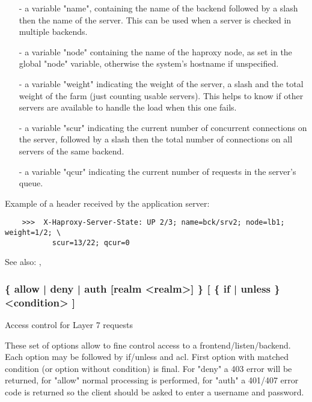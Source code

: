   \begin{itemize}
  \item[-]
      a variable "name", containing the name of the backend followed by a slash
      \chr{/} then the name of the server. This can be used when a server is
      checked in multiple backends.

  \item[-]
      a variable "node" containing the name of the haproxy node, as set in the
      global "node" variable, otherwise the system's hostname if unspecified.

  \item[-]
      a variable "weight" indicating the weight of the server, a slash \chr{/}
      and the total weight of the farm (just counting usable servers). This
      helps to know if other servers are available to handle the load when this
      one fails.

  \item[-]
      a variable "scur" indicating the current number of concurrent connections
      on the server, followed by a slash \chr{/} then the total number of
      connections on all servers of the same backend.

  \item[-]
      a variable "qcur" indicating the current number of requests in the
      server's queue.
  \end{itemize}

  Example of a header received by the application server:
  \begin{verbatim}
    >>>  X-Haproxy-Server-State: UP 2/3; name=bck/srv2; node=lb1; weight=1/2; \
           scur=13/22; qcur=0
  \end{verbatim}


See also: , 

\subsubsection[http-request]{ \{ allow | deny | auth [realm <realm>] \} [ \{ if | unless \} <condition> ]}
\index{http-request}

  Access control for Layer 7 requests


  These set of options allow to fine control access to a
  frontend/listen/backend. Each option may be followed by if/unless and acl.
  First option with matched condition (or option without condition) is final.
  For "deny" a 403 error will be returned, for "allow" normal processing is
  performed, for "auth" a 401/407 error code is returned so the client
  should be asked to enter a username and password.

